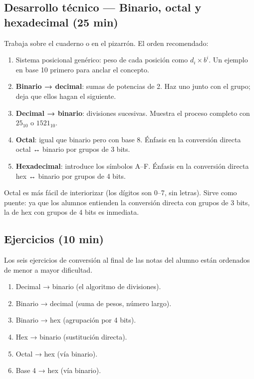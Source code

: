 \documentclass[12pt, oneside]{article}
\begin{document}
\subsection{Desarrollo técnico — Binario, octal y hexadecimal (25 min)}

Trabaja sobre el cuaderno o en el pizarrón. El orden recomendado:

\begin{enumerate}
  \item Sistema posicional genérico: peso de cada posición como
        $d_i \times b^i$. Un ejemplo en base 10 primero para anclar
        el concepto.
  \item \textbf{Binario → decimal}: sumas de potencias de 2.
        Haz uno junto con el grupo; deja que ellos hagan el siguiente.
  \item \textbf{Decimal → binario}: divisiones sucesivas.
        Muestra el proceso completo con $25_{10}$ o $1521_{10}$.
  \item \textbf{Octal}: igual que binario pero con base 8. Énfasis en la
        conversión directa octal ↔ binario por grupos de 3 bits.
  \item \textbf{Hexadecimal}: introduce los símbolos A–F. Énfasis en la
        conversión directa hex ↔ binario por grupos de 4 bits.
\end{enumerate}

\begin{notaprofesor}
  Octal es más fácil de interiorizar (los dígitos son 0–7, sin letras).
  Sirve como puente: ya que los alumnos entienden la conversión directa
  con grupos de 3 bits, la de hex con grupos de 4 bits es inmediata.
\end{notaprofesor}

\subsection{Ejercicios (10 min)}

Los seis ejercicios de conversión al final de las notas del alumno están
ordenados de menor a mayor dificultad.

\begin{enumerate}
  \item Decimal → binario (el algoritmo de divisiones).
  \item Binario → decimal (suma de pesos, número largo).
  \item Binario → hex (agrupación por 4 bits).
  \item Hex → binario (sustitución directa).
  \item Octal → hex (vía binario).
  \item Base 4 → hex (vía binario).
\end{enumerate}
\end{document}
